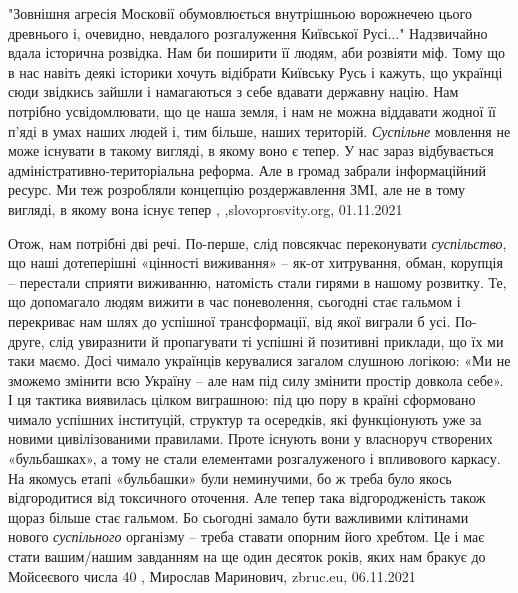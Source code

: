 "Зовнішня агресія Московії обумовлюється внутрішньою ворожнечею цього древнього
і, очевидно, невдалого розгалуження Київської Русі..." Надзвичайно вдала
історична розвідка. Нам би поширити її людям, аби розвіяти міф. Тому що в нас
навіть деякі історики хочуть відібрати Київську Русь і кажуть, що українці сюди
звідкись зайшли і намагаються з себе вдавати державну націю. Нам потрібно
усвідомлювати, що це наша земля, і нам не можна віддавати жодної її п’яді в
умах наших людей і, тим більше, наших територій. \emph{Суспільне} мовлення не може
існувати в такому вигляді, в якому воно є тепер. У нас зараз відбувається
адміністративно-територіальна реформа. Але в громад забрали інформаційний
ресурс. Ми теж розробляли концепцію роздержавлення ЗМІ, але не в тому вигляді,
в якому вона існує тепер
, ,slovoprosvity.org, 01.11.2021

Отож, нам потрібні дві речі. По-перше, слід повсякчас переконувати \emph{суспільство},
що наші дотеперішні «цінності виживання» – як-от хитрування, обман, корупція –
перестали сприяти виживанню, натомість стали гирями в нашому розвитку. Те, що
допомагало людям вижити в час поневолення, сьогодні стає гальмом і перекриває
нам шлях до успішної трансформації, від якої виграли б усі.  По-друге, слід
увиразнити й пропагувати ті успішні й позитивні приклади, що їх ми таки маємо.
Досі чимало українців керувалися загалом слушною логікою: «Ми не зможемо
змінити всю Україну – але нам під силу змінити простір довкола себе». І ця
тактика виявилась цілком виграшною: під цю пору в країні сформовано чимало
успішних інституцій, структур та осередків, які функціонують уже за новими
цивілізованими правилами. Проте існують вони у власноруч створених
«бульбашках», а тому не стали елементами розгалуженого і впливового каркасу. На
якомусь етапі «бульбашки» були неминучими, бо ж треба було якось відгородитися
від токсичного оточення. Але тепер така відгородженість також щораз більше стає
гальмом. Бо сьогодні замало бути важливими клітинами нового \emph{суспільного}
організму – треба ставати опорним його хребтом. Це і має стати вашим/нашим
завданням на ще один десяток років, яких нам бракує до Мойсеєвого числа 40
, 
Мирослав Маринович, zbruc.eu, 06.11.2021

